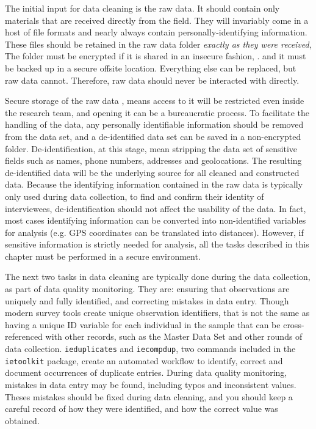 The initial input for data cleaning is the raw data.
It should contain only materials that are received directly from the field.
They will invariably come in a host of file formats
and nearly always contain personally-identifying information.
These files should be retained in the raw data folder
\textit{exactly as they were received},
The folder must be encrypted if it is shared in an insecure fashion,
.
and it must be backed up in a secure offsite location.
Everything else can be replaced, but raw data cannot.
Therefore, raw data should never be interacted with directly.

Secure storage of the raw data
,
means access to it will be restricted even inside the research team,
and opening it can be a bureaucratic process.
To facilitate the handling of the data,
any personally identifiable information should be removed from the data set,
and a de-identified data set can be saved in a non-encrypted folder.
De-identification, at this stage, mean stripping the data set of sensitive fields 
such as names, phone numbers, addresses and geolocations.
The resulting de-identified data will be the underlying source
for all cleaned and constructed data.
Because the identifying information contained in the raw data
is typically only used during data collection, 
to find and confirm their identity of interviewees,
de-identification should not affect the usability of the data.
In fact, most cases identifying information can be converted 
into non-identified variables for analysis
(e.g. GPS coordinates can be translated into distances). 
However, if sensitive information is strictly needed for analysis, 
all the tasks described in this chapter must be performed in a secure environment.


The next two tasks in data cleaning are typically done during the data collection,
as part of data quality monitoring. 
They are: ensuring that observations are uniquely and fully identified,
and correcting mistakes in data entry.
Though modern survey tools create unique observation identifiers,
that is not the same as having a unique ID variable for each individual in the sample
that can be cross-referenced with other records, such as the Master Data Set
and other rounds of data collection.
\texttt{ieduplicates} and \texttt{iecompdup}, 
two commands  included in the \texttt{ietoolkit} package,
create an automated workflow to identify, correct and document
occurrences of duplicate entries. 
During data quality monitoring, mistakes in data entry may be found,
including typos and inconsistent values.
Theses mistakes should be fixed during data cleaning,
and you should keep a careful record of how they were identified, and
how the correct value was obtained.

